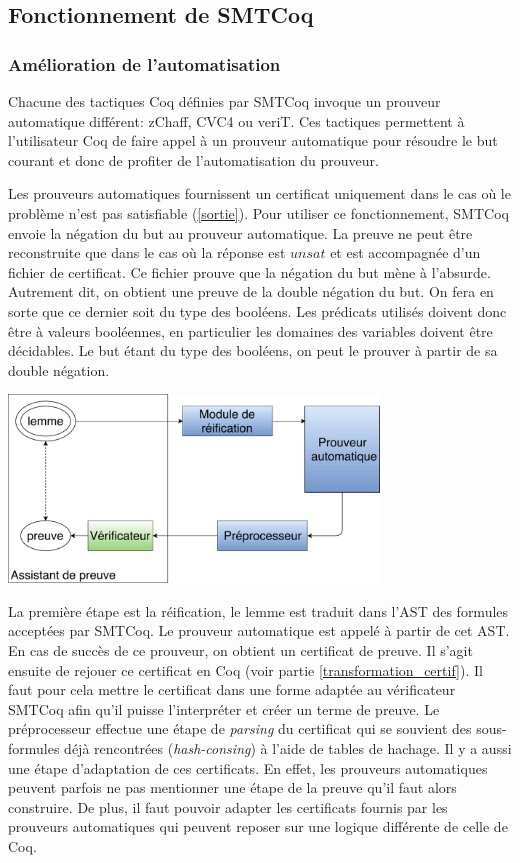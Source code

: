 \documentclass[11pt]{article}
\begin{document}
\subsection{Fonctionnement de SMTCoq}

\subsubsection{Amélioration de l'automatisation}\label{negation}

Chacune des tactiques Coq définies par SMTCoq invoque un prouveur automatique différent: zChaff, CVC4 ou veriT. Ces tactiques permettent à l'utilisateur Coq de faire appel à un prouveur automatique pour résoudre le but courant et donc de profiter de l'automatisation du prouveur. \medbreak



Les prouveurs automatiques fournissent un certificat uniquement dans le cas où le problème n'est pas satisfiable (\ref{sortie}). Pour utiliser ce fonctionnement, SMTCoq envoie la négation du but au prouveur automatique. La preuve ne peut être reconstruite que dans le cas où la réponse est $unsat$ et est accompagnée d'un fichier de certificat. Ce fichier prouve que la négation du but mène à l'absurde. Autrement dit, on obtient une preuve de la double négation du but. On fera en sorte que ce dernier soit du type des booléens. Les prédicats utilisés doivent donc être à valeurs booléennes, en particulier les domaines des variables doivent être décidables.  Le but étant du type des booléens, on peut le prouver à partir de sa double négation.

\begin{center}
    \includegraphics[height=5cm]{Automatisation.pdf}
\end{center}

La première étape est la réification, le lemme est traduit dans l'AST des formules acceptées par SMTCoq. Le prouveur automatique est appelé à partir de cet AST. En cas de succès de ce prouveur, on obtient un certificat de preuve. 
Il s'agit ensuite de rejouer ce certificat en Coq (voir partie \ref{transformation_certif}). Il faut pour cela mettre le certificat dans une forme adaptée au vérificateur SMTCoq afin qu'il puisse l'interpréter et créer un terme de preuve. Le préprocesseur effectue une étape de \textit{parsing} du certificat qui se souvient des sous-formules déjà rencontrées (\textit{hash-consing}) à l'aide de tables de hachage.  Il y a aussi une étape d'adaptation de ces certificats. En effet, les prouveurs automatiques peuvent parfois ne pas mentionner une étape de la preuve qu'il faut alors construire. De plus, il faut pouvoir adapter les certificats fournis par les prouveurs automatiques qui peuvent reposer sur une logique différente de celle de Coq. 
\end{document}
